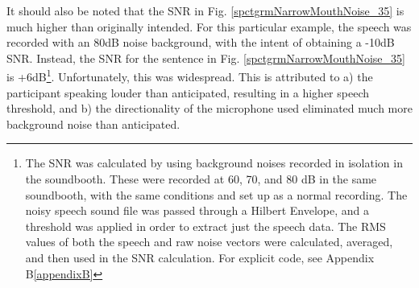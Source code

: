 It should also be noted that the SNR in Fig. \ref{spctgrmNarrowMouthNoise_35} is much higher than originally intended.  For this particular example, the speech was recorded with an 80dB noise background, with the intent of obtaining a -10dB SNR.  Instead, the SNR for the sentence in Fig. \ref{spctgrmNarrowMouthNoise_35} is +6dB\footnote{The SNR was calculated by using background noises recorded in isolation in the soundbooth.  These were recorded at 60, 70, and 80 dB in the same soundbooth, with the same conditions and set up as a normal recording.  The noisy speech sound file was passed through a Hilbert Envelope, and a threshold was applied in order to extract just the speech data.  The RMS values of both the speech and raw noise vectors were calculated, averaged, and then used in the SNR calculation.  For explicit code, see Appendix B\ref{appendixB}}.  Unfortunately, this was widespread. This is attributed to a) the participant speaking louder than anticipated, resulting in a higher speech threshold, and b) the directionality of the microphone used eliminated much more background noise than anticipated.

